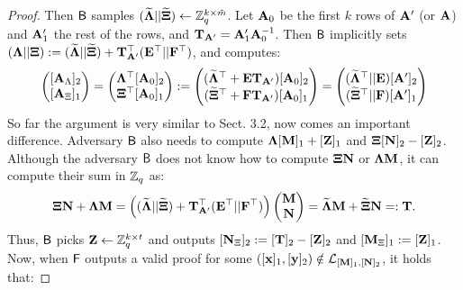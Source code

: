 \begin{proof}
Then $\mathsf{B}$ samples $(\widetilde{\mathbf{{\Lambda}}}||\widetilde{\mathbf{{\Xi}}}) \gets \mathbb{Z}_q^{k \times \tilde{m}}$.  Let $\mathbf{{A}}_0$ be the first $k$ rows of $\mathbf{{A}}'$ (or $\mathbf{{A}}$) and $\mathbf{{A}}_1'$ the rest of the rows, and $\mathbf{{T}}_{\mathbf{{A}}'}=\mathbf{{A}}'_1 \mathbf{{A}}_0^{-1}$. Then $\mathsf{B}$ implicitly sets 
$(\mathbf{{\Lambda}} || \mathbf{{\Xi}}):= (\widetilde{\mathbf{{\Lambda}}} || \widetilde{\mathbf{{\Xi}}})+ \mathbf{{T}}^{\top}_{\mathbf{{A}}'} (\mathbf{{E}}^{\top} || \mathbf{{F}}^{\top})$, and computes:
\begin{equation}
\begin{pmatrix}
[\matrA_{\Lambda}]_2\\
[\matrA_{\Xi}]_1
\end{pmatrix}=
\begin{pmatrix}
\matr{\Lambda}^{\top} [\matrA_0]_2\\
\matr{\Xi}^{\top} [\matrA_0]_1
\end{pmatrix}:=
\begin{pmatrix}
(\widetilde{\matr{\Lambda}}^{\top}+ \matr{E} \matr{T}_{\matrA'}) [\matrA_0]_2 \\
(\widetilde{\matr{\Xi}}^{\top}+ \matr{F} \matr{T}_{\matrA'}) [\matrA_0]_1
\end{pmatrix}
=
\begin{pmatrix}
(\widetilde{\matr{\Lambda}}^{\top}|| \matr{E}) [\matrA']_2 \\
(\widetilde{\matr{\Xi}}^{\top}|| \matr{F} ) [\matrA']_1
\end{pmatrix}
\end{equation}
So far the argument is very similar to \cite{EC:KilWee15} Sect. 3.2, now comes an important difference. 
Adversary $\mathsf{B}$ also needs to compute $\mathbf{{\Lambda}}[\mathbf{{M}}]_1+[\mathbf{{Z}}]_1$ and 
$\mathbf{{\Xi}}[\mathbf{{N}}]_2-[\mathbf{{Z}}]_2$. Although the adversary $\mathsf{B}$ does not know how to 
compute $\mathbf{{\Xi}}\mathbf{{N}}$ or $\mathbf{{\Lambda}}\mathbf{{M}}$, it can compute their sum in $\mathbb{Z}_q$ as:
 $$\mathbf{{\Xi}}\mathbf{{N}}+\mathbf{{\Lambda}}\mathbf{{M}}=
    \left(
        (\widetilde{\mathbf{{\Lambda}}} || \widetilde{\mathbf{{\Xi}}})
        + \mathbf{{T}}^{\top}_{\mathbf{{A}}'}(\mathbf{{E}}^{\top}||\mathbf{{F}}^{\top})
    \right)
 \begin{pmatrix}
    \mathbf{{M}} \\ \mathbf{{N}}
 \end{pmatrix} =\widetilde{\mathbf{{\Lambda}}} \mathbf{{M}}+\widetilde{\mathbf{{\Xi}}} \mathbf{{N}}=:\mathbf{{T}}.  
 $$
Thus, $\mathsf{B}$ picks $\mathbf{{Z}} \gets \mathbb{Z}_q^{k \times t}$ and outputs 
$[\mathbf{{N}}_{\Xi}]_2:=[\mathbf{{T}}]_2-[\mathbf{{Z}}]_2$ and  $[\mathbf{{M}}_{\Xi}]_1:=[\mathbf{{Z}}]_1$.
Now, when $\mathsf{F}$ outputs a valid proof for some $([\mathbf{x}]_1,[\mathbf{y}]_2) \notin \mathcal{L}_{[\mathbf{{M}}]_1,[\mathbf{{N}}]_2}$, it holds that:

\end{proof}
